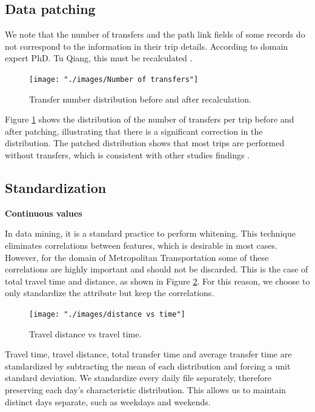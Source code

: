 \documentclass{article}
\begin{document}
\subsection{Data patching}
\label{sec:patching}
We note that the number of transfers and the path link fields of some records do not correspond to the information in their trip details. According to domain expert PhD. Tu Qiang, this must be recalculated \cite{tommy}. 

\begin{figure}[H]
  \centering
  \texttt{[image: "./images/Number of transfers"]}
  \caption{Transfer number distribution before and after recalculation.}
  \label{fig:preprocessing/num_transfers}
\end{figure}

Figure \ref{fig:preprocessing/num_transfers} shows the distribution of the number of transfers per trip before and after patching, illustrating that there is a significant correction in the distribution. The patched distribution shows that most trips are performed without transfers, which is consistent with other studies findings \cite{bhaskar2015passenger}.

\subsection{Standardization} 

\textbf{Continuous values}

In data mining, it is a standard practice to perform whitening. This technique eliminates correlations between features, which is desirable in most cases. However, for the domain of Metropolitan Transportation some of these correlations are highly important and should not be discarded. This is the case of total travel time and distance, as shown in Figure \ref{fig:preprocessing/distance_time_correlation}. For this reason, we choose to only standardize the attribute but keep the correlations. 

\begin{figure}[H]
  \centering
  \texttt{[image: "./images/distance vs time"]}
  \caption{Travel distance vs travel time.}
  \label{fig:preprocessing/distance_time_correlation}
\end{figure}

Travel time, travel distance, total transfer time and average transfer time are standardized by subtracting the mean of each distribution and forcing a unit standard deviation. We standardize every daily file separately, therefore preserving each day's characteristic distribution. This allows us to maintain distinct days separate, such as weekdays and weekends.
\end{document}
